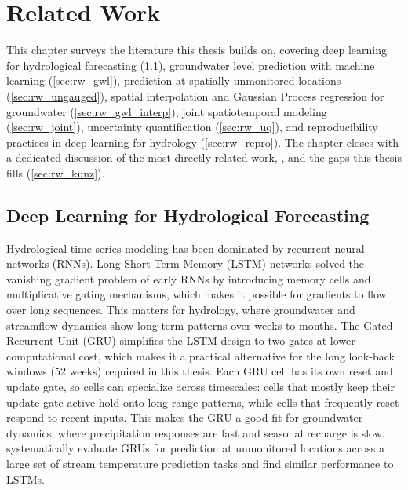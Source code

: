 \chapter{Related Work}
\label{ch:related_work}

This chapter surveys the literature this thesis builds on, covering deep learning for hydrological forecasting
(\cref{sec:rw_dl_hydro}), groundwater level prediction with machine learning
(\cref{sec:rw_gwl}), prediction at spatially unmonitored locations
(\cref{sec:rw_ungauged}), spatial interpolation and Gaussian Process regression for
groundwater (\cref{sec:rw_gwl_interp}), joint spatiotemporal modeling
(\cref{sec:rw_joint}), uncertainty quantification (\cref{sec:rw_uq}), and
reproducibility practices in deep learning for hydrology (\cref{sec:rw_repro}). The chapter
closes with a dedicated discussion of the most directly related work, \citet{kunz2025}, and
the gaps this thesis fills (\cref{sec:rw_kunz}).

\section{Deep Learning for Hydrological Forecasting}
\label{sec:rw_dl_hydro}

Hydrological time series modeling has been dominated by recurrent neural
networks (RNNs). Long Short-Term Memory (LSTM) networks \citep{hochreiter1997long}
solved the vanishing gradient problem of early RNNs by introducing memory cells and
multiplicative gating mechanisms, which makes it possible for gradients to flow over
long sequences. This matters for hydrology, where groundwater and streamflow
dynamics show long-term patterns over weeks to months.
The Gated Recurrent Unit (GRU) \citep{cho2014learning} simplifies the LSTM design to two gates at lower computational cost, which makes it a practical alternative for the long look-back windows (52 weeks) required in this thesis.
Each GRU cell has its own reset and update gate, so cells can specialize across timescales:
cells that mostly keep their update gate active hold onto long-range patterns, while cells
that frequently reset respond to recent inputs. This makes the GRU a good fit for
groundwater dynamics, where precipitation responses are fast and seasonal recharge is slow.
\citet{willard2025ensembles} systematically evaluate GRUs for prediction at unmonitored
locations across a large set of stream temperature prediction tasks and find similar performance to LSTMs.

